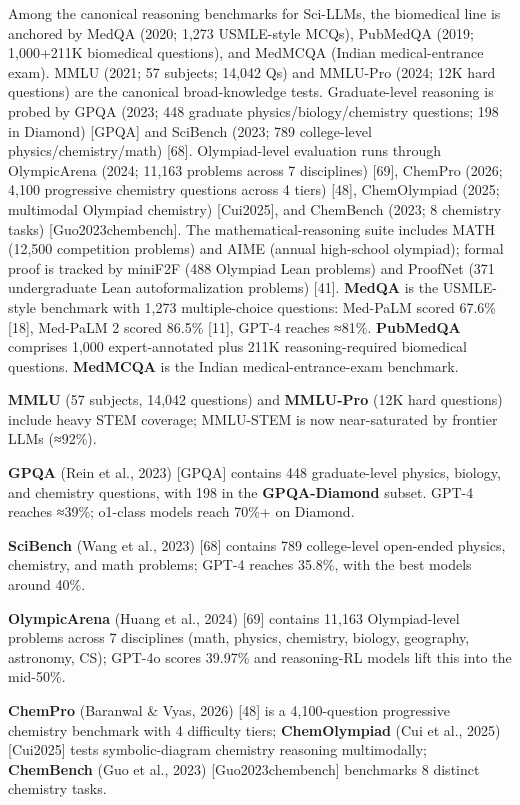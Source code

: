 Among the canonical reasoning benchmarks for Sci-LLMs, the biomedical line is anchored by MedQA (2020; 1,273 USMLE-style MCQs), PubMedQA (2019; 1,000+211K biomedical questions), and MedMCQA (Indian medical-entrance exam). MMLU (2021; 57 subjects; 14,042 Qs) and MMLU-Pro (2024; 12K hard questions) are the canonical broad-knowledge tests. Graduate-level reasoning is probed by GPQA (2023; 448 graduate physics/biology/chemistry questions; 198 in Diamond) {[}GPQA{]} and SciBench (2023; 789 college-level physics/chemistry/math) {[}68{]}. Olympiad-level evaluation runs through OlympicArena (2024; 11,163 problems across 7 disciplines) {[}69{]}, ChemPro (2026; 4,100 progressive chemistry questions across 4 tiers) {[}48{]}, ChemOlympiad (2025; multimodal Olympiad chemistry) {[}Cui2025{]}, and ChemBench (2023; 8 chemistry tasks) {[}Guo2023chembench{]}. The mathematical-reasoning suite includes MATH (12,500 competition problems) and AIME (annual high-school olympiad); formal proof is tracked by miniF2F (488 Olympiad Lean problems) and ProofNet (371 undergraduate Lean autoformalization problems) {[}41{]}. \textbf{MedQA} is the USMLE-style benchmark with 1,273 multiple-choice questions: Med-PaLM scored 67.6\% {[}18{]}, Med-PaLM 2 scored 86.5\% {[}11{]}, GPT-4 reaches ≈81\%. \textbf{PubMedQA} comprises 1,000 expert-annotated plus 211K reasoning-required biomedical questions. \textbf{MedMCQA} is the Indian medical-entrance-exam benchmark.

\textbf{MMLU} (57 subjects, 14,042 questions) and \textbf{MMLU-Pro} (12K hard questions) include heavy STEM coverage; MMLU-STEM is now near-saturated by frontier LLMs (≈92\%).

\textbf{GPQA} (Rein et al., 2023) {[}GPQA{]} contains 448 graduate-level physics, biology, and chemistry questions, with 198 in the \textbf{GPQA-Diamond} subset. GPT-4 reaches ≈39\%; o1-class models reach 70\%+ on Diamond.

\textbf{SciBench} (Wang et al., 2023) {[}68{]} contains 789 college-level open-ended physics, chemistry, and math problems; GPT-4 reaches 35.8\%, with the best models around 40\%.

\textbf{OlympicArena} (Huang et al., 2024) {[}69{]} contains 11,163 Olympiad-level problems across 7 disciplines (math, physics, chemistry, biology, geography, astronomy, CS); GPT-4o scores 39.97\% and reasoning-RL models lift this into the mid-50\%.

\textbf{ChemPro} (Baranwal \& Vyas, 2026) {[}48{]} is a 4,100-question progressive chemistry benchmark with 4 difficulty tiers; \textbf{ChemOlympiad} (Cui et al., 2025) {[}Cui2025{]} tests symbolic-diagram chemistry reasoning multimodally; \textbf{ChemBench} (Guo et al., 2023) {[}Guo2023chembench{]} benchmarks 8 distinct chemistry tasks.

